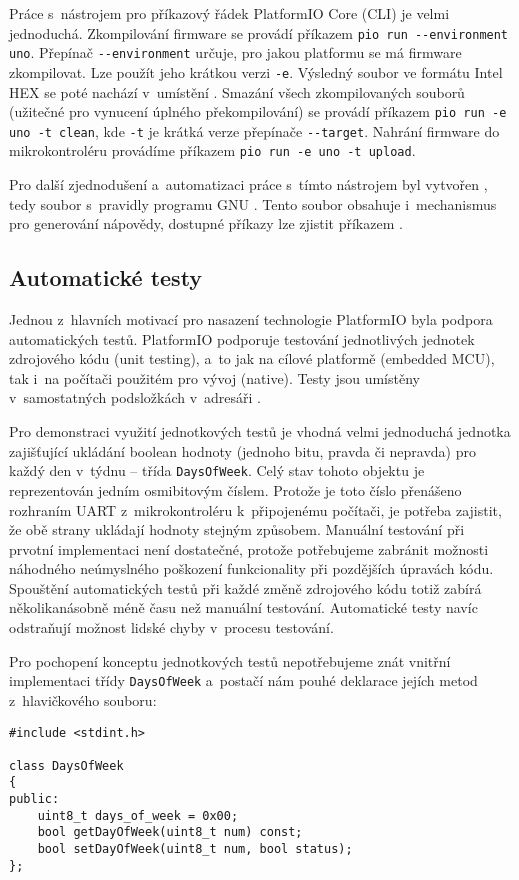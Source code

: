 Práce s~nástrojem pro příkazový řádek PlatformIO Core (CLI) je velmi
jednoduchá. Zkompilování firmware se provádí příkazem
\verb|pio run --environment uno|. Přepínač \verb|--environment| určuje,
pro jakou platformu se má firmware zkompilovat. Lze použít jeho krátkou verzi
\verb|-e|. Výsledný soubor ve formátu Intel HEX se poté nachází v~umístění
. Smazání všech zkompilovaných souborů
(užitečné pro vynucení úplného překompilování) se provádí příkazem
\verb|pio run -e uno -t clean|, kde \verb|-t| je krátká verze přepínače
\verb|--target|. Nahrání firmware do mikrokontroléru provádíme příkazem
\verb|pio run -e uno -t upload|.

Pro další zjednodušení a~automatizaci práce s~tímto nástrojem byl vytvořen
, tedy soubor s~pravidly programu GNU .
Tento soubor obsahuje i~mechanismus pro generování nápovědy, dostupné příkazy
lze zjistit příkazem .

\subsection{Automatické testy}
Jednou z~hlavních motivací pro nasazení technologie PlatformIO byla podpora
automatických testů. PlatformIO podporuje testování jednotlivých jednotek
zdrojového kódu \foreignlanguage{english}{(unit testing)}, %
a~to jak na cílové platformě (embedded MCU), tak i~na počítači použitém pro
vývoj (native). Testy jsou umístěny v~samostatných podsložkách v~adresáři
.

Pro demonstraci využití jednotkových testů je vhodná velmi jednoduchá jednotka
zajišťující ukládání boolean hodnoty (jednoho bitu, pravda či nepravda) pro
každý den v~týdnu -- třída \texttt{DaysOfWeek}. Celý stav tohoto objektu je
reprezentován jedním osmibitovým číslem. Protože je toto číslo přenášeno
rozhraním UART z~mikrokontroléru k~připojenému počítači, je potřeba zajistit,
že obě strany ukládají hodnoty stejným způsobem. Manuální testování při prvotní
implementaci není dostatečné, protože potřebujeme zabránit možnosti náhodného
neúmyslného poškození funkcionality při pozdějších úpravách kódu. Spouštění
automatických testů při každé změně zdrojového kódu totiž zabírá
několikanásobně méně času než manuální testování. Automatické testy navíc
odstraňují možnost lidské chyby v~procesu testování.

Pro pochopení konceptu jednotkových testů nepotřebujeme znát vnitřní
implementaci třídy \texttt{DaysOfWeek} a~postačí nám pouhé deklarace jejích
metod z~hlavičkového souboru:
\begin{lstlisting}[language=myC++]
#include <stdint.h>

class DaysOfWeek
{
public:
    uint8_t days_of_week = 0x00;
    bool getDayOfWeek(uint8_t num) const;
    bool setDayOfWeek(uint8_t num, bool status);
};
\end{lstlisting}

